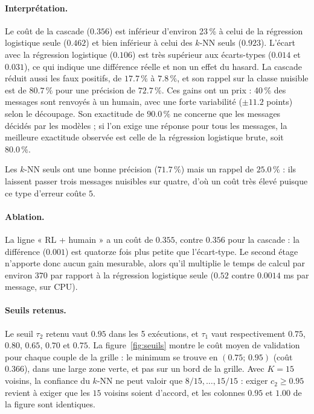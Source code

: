\documentclass[a4paper,fleqn]{cas-sc}
\begin{document}
\paragraph{Interprétation.} Le coût de la cascade ($0.356$) est inférieur d'environ 23\,\% à celui de la
régression logistique seule ($0.462$) et bien inférieur à celui des $k$-NN seuls ($0.923$). L'écart avec la
régression logistique ($0.106$) est très supérieur aux écarts-types ($0.014$ et $0.031$), ce qui indique
une différence réelle et non un effet du hasard. La cascade réduit aussi les faux positifs, de $17.7\,\%$
à $7.8\,\%$, et son rappel sur la classe nuisible est de $80.7\,\%$ pour une précision de $72.7\,\%$.
Ces gains ont un prix : 40\,\% des messages sont renvoyés à un humain, avec une forte variabilité
($\pm 11.2$ points) selon le découpage. Son exactitude de $90.0\,\%$ ne concerne que les messages décidés par
les modèles ; si l'on exige une réponse pour tous les messages, la meilleure exactitude observée est
celle de la régression logistique brute, soit $80.0\,\%$.

Les $k$-NN seuls ont une bonne précision ($71.7\,\%$) mais un rappel de $25.0\,\%$ : ils laissent passer
trois messages nuisibles sur quatre, d'où un coût très élevé puisque ce type d'erreur coûte $5$.

\paragraph{Ablation.} La ligne « RL + humain » a un coût de $0.355$, contre $0.356$ pour la cascade : la différence
($0.001$) est quatorze fois plus petite que l'écart-type. Le second étage n'apporte donc aucun gain
mesurable, alors qu'il multiplie le temps de calcul par environ $370$ par rapport à la régression logistique
seule ($0.52$ contre $0.0014$ ms par message, sur CPU).

\paragraph{Seuils retenus.} Le seuil $\tau_2$ retenu vaut $0.95$ dans les 5 exécutions, et $\tau_1$ vaut respectivement
$0.75$, $0.80$, $0.65$, $0.70$ et $0.75$. La figure~\ref{fig:seuils} montre le coût moyen de validation pour
chaque couple de la grille : le minimum se trouve en $(0.75;\,0.95)$ (coût $0.366$), dans une large zone
verte, et pas sur un bord de la grille. Avec $K=15$ voisins, la confiance du $k$-NN ne peut valoir que
$8/15,\dots,15/15$ : exiger $c_2\ge 0.95$ revient à exiger que les $15$ voisins soient d'accord, et les colonnes
$0.95$ et $1.00$ de la figure sont identiques.
\end{document}
